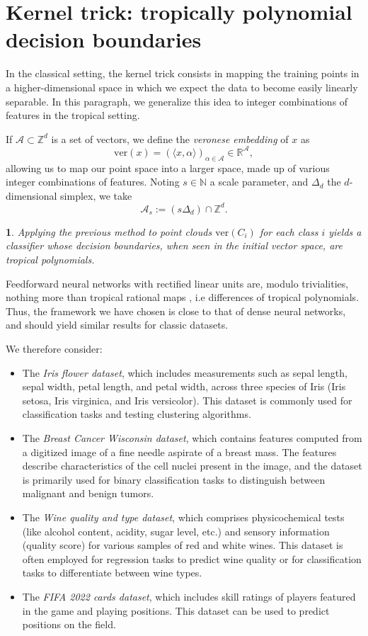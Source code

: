 \documentclass[oneside,english]{amsart}
\numberwithin{equation}{section}
\numberwithin{figure}{section}
\theoremstyle{plain}
\theoremstyle{definition}
\theoremstyle{plain}
\newtheorem{prop}[thm]{\protect\propositionname}
\theoremstyle{remark}
\theoremstyle{plain}
\theoremstyle{definition}
\theoremstyle{definition}
\providecommand{\propositionname}{Proposition}
\begin{document}
\section{Kernel trick: tropically polynomial decision boundaries}

In the classical setting, the kernel trick consists in mapping the training points in a higher-dimensional space in which we expect the data to become easily linearly separable. In this paragraph, we generalize this idea to integer combinations of features in the tropical setting. 

If $\mathcal{A}\subset \mathbb{Z}^d$ is a set of vectors, we define the \emph{veronese embedding} of $x$ as $$\text{ver}(x) = \left(\langle x, \alpha \rangle\right)_{\alpha\in \mathcal{A}}\in\mathbb{R}^\mathcal{A},$$ allowing us to map our point space into a larger space, made up of various integer combinations of features. Noting $s\in\mathbb{N}$ a scale parameter, and $\Delta_d$ the $d$-dimensional simplex, we take $$\mathcal{A}_s := (s\Delta_d) \cap \mathbb{Z}^d.$$

\begin{prop}
Applying the previous method to point clouds $\text{ver}(C_i)$ for each class $i$ yields a classifier whose decision boundaries, when seen in the initial vector space, are tropical polynomials.
\end{prop}

Feedforward neural networks with rectified linear units are, modulo trivialities, nothing more than tropical rational maps \cite{zhang2018tropical}, i.e differences of tropical polynomials. Thus, the framework we have chosen is close to that of dense neural networks, and should yield similar results for classic datasets.

We therefore consider:
\begin{itemize}
    \item The \emph{Iris flower dataset}, which includes measurements such as sepal length, sepal width, petal length, and petal width, across three species of Iris (Iris setosa, Iris virginica, and Iris versicolor). This dataset is commonly used for classification tasks and testing clustering algorithms.
    \item The \emph{Breast Cancer Wisconsin dataset}, which contains features computed from a digitized image of a fine needle aspirate of a breast mass. The features describe characteristics of the cell nuclei present in the image, and the dataset is primarily used for binary classification tasks to distinguish between malignant and benign tumors.
    \item The \emph{Wine quality and type dataset}, which comprises physicochemical tests (like alcohol content, acidity, sugar level, etc.) and sensory information (quality score) for various samples of red and white wines. This dataset is often employed for regression tasks to predict wine quality or for classification tasks to differentiate between wine types.
    \item The \emph{FIFA 2022 cards dataset}, which includes skill ratings of players featured in the game and playing positions. This dataset can be used to predict positions on the field.
\end{itemize}
\end{document}
